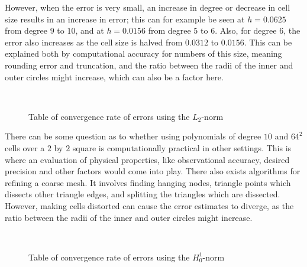 However, when the error is very small, an increase in degree or decrease in cell size results in 
an increase in error; this can for example be seen at $h=0.0625$ from degree $9$ to $10$, and 
at $h=0.0156$ from degree $5$ to $6$. 
Also, for degree $6$, the error also increases as the cell size is halved from $0.0312$ to $0.0156$.
This can be explained both by computational accuracy for 
numbers of this size, meaning rounding error and truncation, and the ratio between the radii of the
inner and outer circles might increase, which can also be a factor here.
\begin{figure}[ht]
    \center~
    \caption{Table of convergence rate of errors using the $L_2$-norm}\label{tab:convergence_l2}
\end{figure}
There can be some question as to whether using polynomials of degree $10$ and $64^2$ cells over a 
$2$ by $2$ square is computationally practical in other settings. 
This is where an evaluation of physical properties, like observational accuracy, desired precision and other 
factors would come into play.
There also exists algorithms for refining a coarse mesh. It involves finding hanging nodes, triangle 
points which dissects other triangle edges, and splitting the triangles which are dissected. 
However, making cells distorted can cause the error estimates to diverge, as the ratio between the radii of the
inner and outer circles might increase.
\begin{figure}[ht]
    \center~
    \caption{Table of convergence rate of errors using the $H_0^1$-norm}
\end{figure}